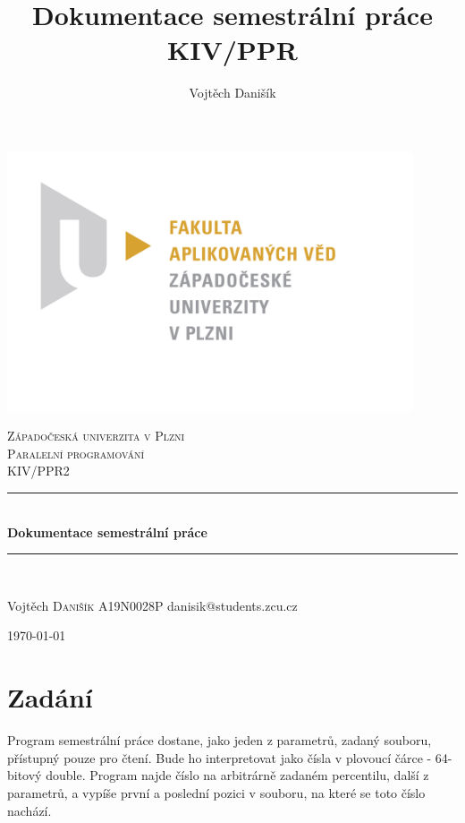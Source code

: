 \documentclass[12pt, a4paper]{article}
\title{\textbf{Dokumentace semestrální práce} \\KIV/PPR}
\author{Vojtěch Danišík}
\begin{document}
\begin{titlepage} 
	\newcommand{\HRule}{\rule{\linewidth}{0.5mm}} 
	\begin{center}
	\includegraphics[width=12cm]{img/fav_logo}\\
	\end{center}
	\textsc{\LARGE Západočeská univerzita v Plzni}\\[1.5cm] 	
	\textsc{\Large Paralelní programování}\\[0.5cm] 
	\textsc{\large KIV/PPR2}\\[0.5cm] 
	\HRule\\[0.4cm]
	{\huge\bfseries Dokumentace semestrální práce}\\[0.4cm] 
	\HRule\\[1.5cm]

	\begin{minipage}{0.4\textwidth}
		\begin{flushleft}
			\large
			Vojtěch \textsc{Danišík}\newline
			A19N0028P\newline
			danisik@students.zcu.cz
		\end{flushleft}
	\end{minipage}
	\vfill\vfill\vfill
	\begin{flushright}
	{\large\today}
	\end{flushright}
	\vfill 
\end{titlepage}
\newpage
\tableofcontents
\newpage

\section{Zadání}
Program semestrální práce dostane, jako jeden z parametrů, zadaný souboru, přístupný pouze pro čtení. Bude ho interpretovat jako čísla v plovoucí čárce - 64-bitový double. Program najde číslo na arbitrárně zadaném percentilu, další z parametrů, a vypíše první a poslední pozici v souboru, na které se toto číslo nachází.\\
\end{document}
